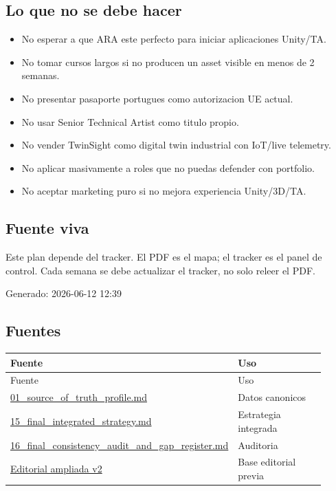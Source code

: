 \subsection{Lo que no se debe hacer}


\begin{itemize}
\item No esperar a que ARA este perfecto para iniciar aplicaciones Unity/TA.
\item No tomar cursos largos si no producen un asset visible en menos de 2 semanas.
\item No presentar pasaporte portugues como autorizacion UE actual.
\item No usar Senior Technical Artist como titulo propio.
\item No vender TwinSight como digital twin industrial con IoT/live telemetry.
\item No aplicar masivamente a roles que no puedas defender con portfolio.
\item No aceptar marketing puro si no mejora experiencia Unity/3D/TA.
\end{itemize}


\subsection{Fuente viva}


Este plan depende del tracker. El PDF es el mapa; el tracker es el panel de control. Cada semana se debe actualizar el tracker, no solo releer el PDF.


Generado: 2026-06-12 12:39


\subsection{Fuentes}


\begin{center}
\scriptsize
\begin{longtable}{>{\raggedright\arraybackslash}p{0.455\linewidth} >{\raggedright\arraybackslash}p{0.455\linewidth}}
\toprule
Fuente & Uso \\
\midrule
\endfirsthead
\toprule
Fuente & Uso \\
\midrule
\endhead
\href{file:///E:/Laboral/01_source_of_truth_profile.md}{01\_source\_of\_truth\_profile.md} & Datos canonicos \\
\href{file:///E:/Laboral/15_final_integrated_strategy.md}{15\_final\_integrated\_strategy.md} & Estrategia integrada \\
\href{file:///E:/Laboral/16_final_consistency_audit_and_gap_register.md}{16\_final\_consistency\_audit\_and\_gap\_register.md} & Auditoria \\
\href{file:///E:/Laboral/_pdf_biblia/dist/Biblia_Profesional_Alexander_EDITORIAL_AMPLIADA_v2.pdf}{Editorial ampliada v2} & Base editorial previa \\
\bottomrule
\end{longtable}
\end{center}
